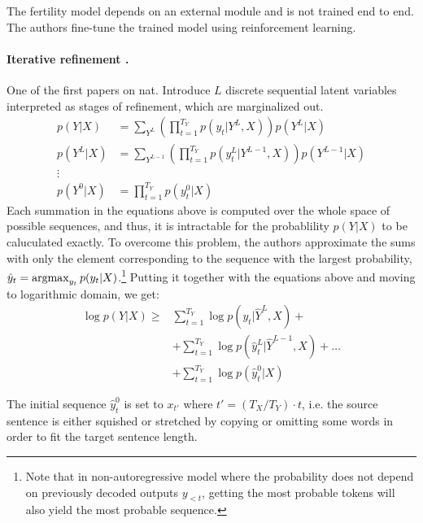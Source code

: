 The fertility model depends on an external module and is not trained end to
end. The authors fine-tune the trained model using reinforcement learning.


\paragraph{Iterative refinement \citep{lee2018deterministic}.} One of the first
papers on \gls{nat}. Introduce $L$ discrete sequential latent variables
interpreted as stages of refinement, which are marginalized out.
\begin{align*}
  p(Y|X) & = \sum_{Y^L}
           \left( \prod_{t=1}^{T_Y} p(y_t|Y^L, X) \right) p(Y^L|X) \\
  p(Y^L|X) & = \sum_{Y^{L-1}}
             \left( \prod_{t=1}^{T_Y} p(y_t^L | Y^{L-1}, X) \right)
             p(Y^{L-1}|X) \\
  \vdots \nonumber \\
  p(Y^0|X) & = \prod_{t=1}^{T_Y} p(y_t^0|X)  
\end{align*}
Each summation in the equations above is computed over the whole space of
possible sequences, and thus, it is intractable for the probablility $p(Y|X)$ to
be caluculated exactly. To overcome this problem, the authors approximate the
sums with only the element corresponding to the sequence with the largest
probability, $\hat{y}_t = \operatorname*{argmax}_{y_t}p(y_t|X)$.\footnote{Note that in
  non-autoregressive model where the probability does not depend on previously
  decoded outputs $y_{<t}$, getting the most probable tokens will also yield the
  most probable sequence.}  Putting it together with the equations above and
moving to logarithmic domain, we get:
\begin{align}
  \log p(Y|X) \geq
    & \sum_{t=1}^{T_Y} \log p(y_t| \hat{Y}^L, X) + \\
    & + \sum_{t=1}^{T_Y} \log p(\hat{y}_t^{L}| \hat{Y}^{L-1}, X) + \ldots \\
    & + \sum_{t=1}^{T_Y} \log p(\hat{y}_t^0 | X) \label{eq:refinement-lowerbound}
\end{align}

The initial sequence $\hat{y}_t^0$ is set to $x_{t'}$ where
$t' = (T_X / T_Y) \cdot t$, i.e. the source sentence is either squished or
stretched by copying or omitting some words in order to fit the target sentence
length.

